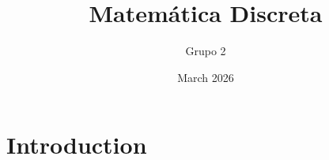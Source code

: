 \documentclass{article}
\title{Matemática Discreta}
\author{Grupo 2}
\date{March 2026}
\begin{document}
\maketitle

\section{Introduction}
\end{document}
